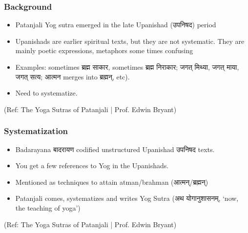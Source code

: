 \begin{frame}[fragile]\frametitle{Background}

	\begin{itemize}
	\item Patanjali Yog sutra emerged in the late Upanishad (उपनिषद) period
	\item Upanishads are earlier spiritual texts, but they are not systematic. They are mainly poetic expressions, metaphors some times confusing
	\item Examples: sometimes ब्रह्म साकार, sometimes ब्रह्म निराकार; जगत् मिथ्या, जगत् माया, जगत् सत्य; आत्मन merges into ब्रह्मन्, etc). 
	\item Need to systematize.
	\end{itemize}

\tiny{(Ref: The Yoga Sutras of Patanjali | Prof. Edwin Bryant)}

\end{frame}

\begin{frame}[fragile]\frametitle{Systematization}

	\begin{itemize}
	\item Badarayana बादरायण codified unstructured Upanishad  उपनिषद texts.
	\item You get a few references to Yog in the Upanishads.
	\item Mentioned as techniques to attain atman/brahman (आत्मन्/ब्रह्मन्)
	\item Patanjali comes, systematizes and writes Yog Sutra (अथ योगानुशासनम्, `now, the teaching of yoga')
	\end{itemize}

\tiny{(Ref: The Yoga Sutras of Patanjali | Prof. Edwin Bryant)}

\end{frame}

